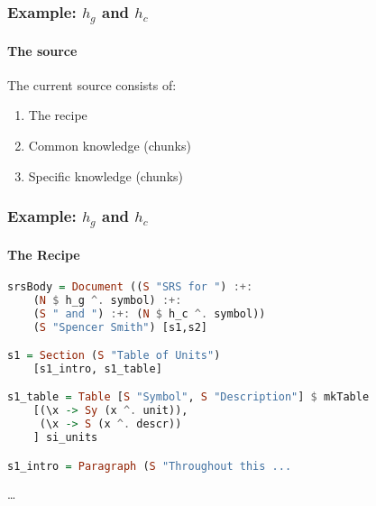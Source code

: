 \documentclass{beamer}
\begin{document}

\begin{frame}

\frametitle{Example: $h_g$ and $h_c$}

\framesubtitle{The source}

The current source consists of:
\begin{enumerate}
	\item The recipe %
	\item Common knowledge (chunks) %
	\item Specific knowledge (chunks) %

\end{enumerate}
\end{frame}



\begin{frame}[fragile]

\frametitle{Example: $h_g$ and $h_c$}

\framesubtitle{The Recipe}


\begin{lstlisting}[language=Haskell, frame=single, showstringspaces=false, basicstyle=\scriptsize]
srsBody = Document ((S "SRS for ") :+: 
    (N $ h_g ^. symbol) :+: 
    (S " and ") :+: (N $ h_c ^. symbol)) 
    (S "Spencer Smith") [s1,s2]

s1 = Section (S "Table of Units") 
    [s1_intro, s1_table]

s1_table = Table [S "Symbol", S "Description"] $ mkTable
    [(\x -> Sy (x ^. unit)),
     (\x -> S (x ^. descr))
    ] si_units

s1_intro = Paragraph (S "Throughout this ...
\end{lstlisting} 
\LARGE{\ldots}


\end{frame}

\end{document}
